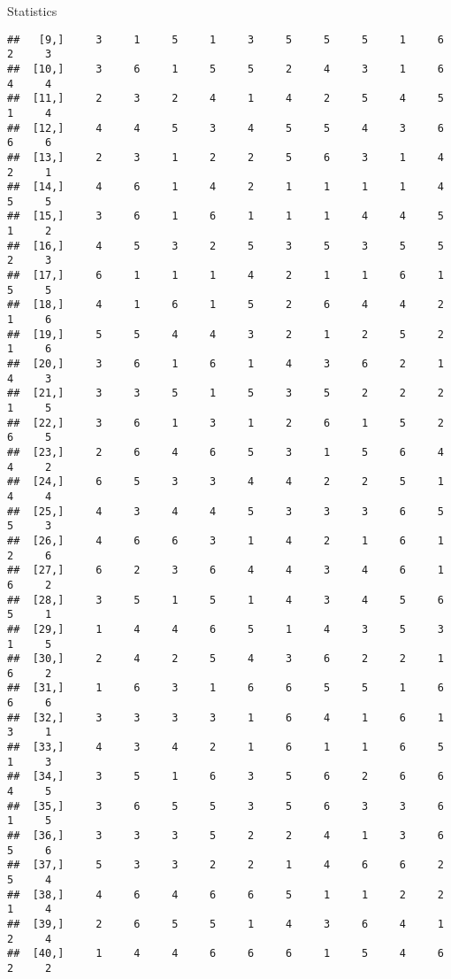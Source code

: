 \documentclass[
  ignorenonframetext,
]{beamer}
\begin{document}
\begin{frame}[fragile]{Statistics}
\begin{verbatim}
##   [9,]     3     1     5     1     3     5     5     5     1     6     2     3
##  [10,]     3     6     1     5     5     2     4     3     1     6     4     4
##  [11,]     2     3     2     4     1     4     2     5     4     5     1     4
##  [12,]     4     4     5     3     4     5     5     4     3     6     6     6
##  [13,]     2     3     1     2     2     5     6     3     1     4     2     1
##  [14,]     4     6     1     4     2     1     1     1     1     4     5     5
##  [15,]     3     6     1     6     1     1     1     4     4     5     1     2
##  [16,]     4     5     3     2     5     3     5     3     5     5     2     3
##  [17,]     6     1     1     1     4     2     1     1     6     1     5     5
##  [18,]     4     1     6     1     5     2     6     4     4     2     1     6
##  [19,]     5     5     4     4     3     2     1     2     5     2     1     6
##  [20,]     3     6     1     6     1     4     3     6     2     1     4     3
##  [21,]     3     3     5     1     5     3     5     2     2     2     1     5
##  [22,]     3     6     1     3     1     2     6     1     5     2     6     5
##  [23,]     2     6     4     6     5     3     1     5     6     4     4     2
##  [24,]     6     5     3     3     4     4     2     2     5     1     4     4
##  [25,]     4     3     4     4     5     3     3     3     6     5     5     3
##  [26,]     4     6     6     3     1     4     2     1     6     1     2     6
##  [27,]     6     2     3     6     4     4     3     4     6     1     6     2
##  [28,]     3     5     1     5     1     4     3     4     5     6     5     1
##  [29,]     1     4     4     6     5     1     4     3     5     3     1     5
##  [30,]     2     4     2     5     4     3     6     2     2     1     6     2
##  [31,]     1     6     3     1     6     6     5     5     1     6     6     6
##  [32,]     3     3     3     3     1     6     4     1     6     1     3     1
##  [33,]     4     3     4     2     1     6     1     1     6     5     1     3
##  [34,]     3     5     1     6     3     5     6     2     6     6     4     5
##  [35,]     3     6     5     5     3     5     6     3     3     6     1     5
##  [36,]     3     3     3     5     2     2     4     1     3     6     5     6
##  [37,]     5     3     3     2     2     1     4     6     6     2     5     4
##  [38,]     4     6     4     6     6     5     1     1     2     2     1     4
##  [39,]     2     6     5     5     1     4     3     6     4     1     2     4
##  [40,]     1     4     4     6     6     6     1     5     4     6     2     2

\end{verbatim}
\end{frame}
\end{document}
